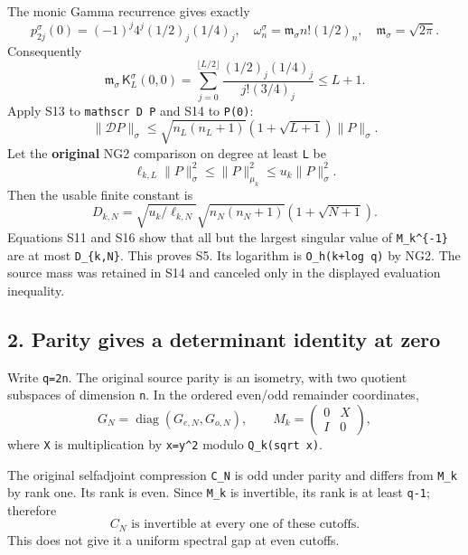 \documentclass[11pt]{article}
\begin{document}
The monic Gamma recurrence gives exactly \[
 p_{2j}^{\sigma}(0)=(-1)^j4^j(1/2)_j(1/4)_j,\quad
 \omega_n^\sigma=\mathfrak m_\sigma n!(1/2)_n,
 \quad\mathfrak m_\sigma=\sqrt{2\pi}.
\] Consequently \[
 \mathfrak m_\sigma\,\mathsf K_L^{\sigma}(0,0)
 =\sum_{j=0}^{\lfloor L/2\rfloor}
 \frac{(1/2)_j(1/4)_j}{j!(3/4)_j}\le L+1.                          \tag{S14}
\] Apply S13 to \texttt{mathscr\ D\ P} and S14 to \texttt{P(0)}: \[
 \|\mathscr D P\|_\sigma
 \le\sqrt{n_L(n_L+1)}(1+\sqrt{L+1})\|P\|_\sigma.                  \tag{S15}
\] Let the \textbf{original} NG2 comparison on degree at least \texttt{L} be \[
 \ell_{k,L}\|P\|_\sigma^2\le\|P\|_{\mu_k}^2\le u_k\|P\|_\sigma^2.
\] Then the usable finite constant is \[
 \boxed{D_{k,N}
 =\sqrt{u_k/\ell_{k,N}}\sqrt{n_N(n_N+1)}(1+\sqrt{N+1}).}           \tag{S16}
\] Equations S11 and S16 show that all but the largest singular value of \texttt{M\_k\^{}\{-1\}} are at most \texttt{D\_\{k,N\}}. This proves S5. Its logarithm is \texttt{O\_h(k+log\ q)} by NG2. The source mass was retained in S14 and canceled only in the displayed evaluation inequality.

\subsection{2. Parity gives a determinant identity at zero}\label{parity-gives-a-determinant-identity-at-zero}

Write \texttt{q=2n}. The original source parity is an isometry, with two quotient subspaces of dimension \texttt{n}. In the ordered even/odd remainder coordinates, \[
 G_N=\operatorname{diag}(G_{e,N},G_{o,N}),\qquad
 M_k=\begin{pmatrix}0&X\\I&0\end{pmatrix},                         \tag{S17}
\] where \texttt{X} is multiplication by \texttt{x=y\^{}2} modulo \texttt{Q\_k(sqrt\ x)}.

The original selfadjoint compression \texttt{C\_N} is odd under parity and differs from \texttt{M\_k} by rank one. Its rank is even. Since \texttt{M\_k} is invertible, its rank is at least \texttt{q-1}; therefore \[
 \boxed{C_N\text{ is invertible at every one of these cutoffs.}}   \tag{S18}
\] This does not give it a uniform spectral gap at even cutoffs.
\end{document}
